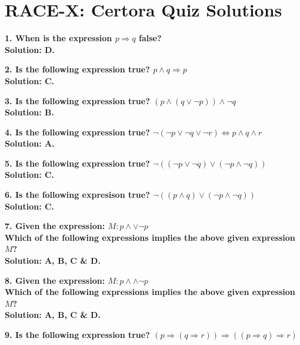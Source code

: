 \section{RACE-X: Certora Quiz Solutions}

\textbf{1. When is the expression $p\Rightarrow q$ false?}\label{sec:raceXcertora_q1}\\

\textbf{Solution: D.}

\textbf{2. Is the following expression true? $p\wedge q\Rightarrow p$}\label{sec:raceXcertora_q2}\\

\textbf{Solution: C.}

\textbf{3. Is the following expression true? $(p\wedge(q\vee\neg p))\wedge\neg q$}\label{sec:raceXcertora_q3}\\

\textbf{Solution: B.}

\textbf{4. Is the following expression true? $\neg (\neg p\vee\neg q\vee\neg r)\Leftrightarrow p\wedge q\wedge r$}\label{sec:raceXcertora_q4}\\

\textbf{Solution: A.}

\textbf{5. Is the following expression true? $\neg((\neg p\vee\neg q)\vee (\neg p\wedge\neg q))$}\label{sec:raceXcertora_q5}\\

\textbf{Solution: C.}

\textbf{6. Is the following expresison true? $\neg((p\wedge q)\vee(\neg p\wedge\neg q))$}\label{sec:raceXcertora_q6}\\

\textbf{Solution: C.}

\textbf{7. Given the expression: $M:p\wedge\vee\neg p$\\
Which of the following expressions implies the above given expression $M$?}\label{sec:raceXcertora_q7}\\

\textbf{Solution: A, B, C \& D.}

\pagebreak

\textbf{8. Given the expression: $M:p\wedge\wedge\neg p$\\
Which of the following expressions implies the above given expression $M$?}\label{sec:raceXcertora_q8}\\

\textbf{Solution: A, B, C \& D.}

\textbf{9. Is the following expression true? $(p\Rightarrow (q\Rightarrow r))\Rightarrow((p\Rightarrow q)\Rightarrow r)$}\label{sec:raceXcertora_q9}\\

